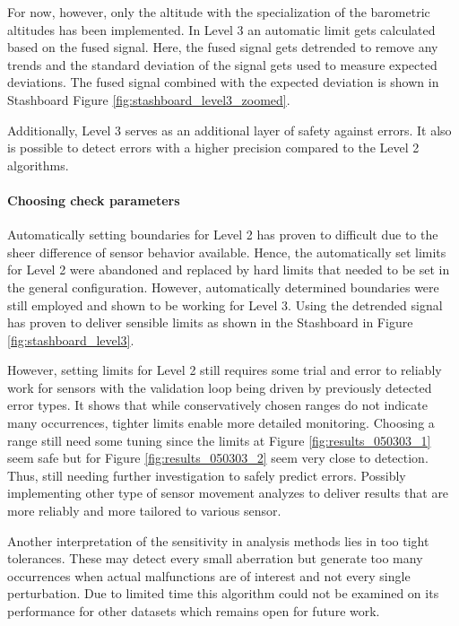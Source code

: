 For now, however, only the altitude with the specialization of the barometric altitudes has been implemented. In Level 3 an automatic limit gets calculated based on the fused signal. Here, the fused signal gets detrended to remove any trends and the standard deviation of the signal gets used to measure expected deviations. The fused signal combined with the expected deviation is shown in Stashboard Figure \ref{fig:stashboard_level3_zoomed}.

Additionally, Level 3 serves as an additional layer of safety against errors. It also is possible to detect errors with a higher precision compared to the Level 2 algorithms.




\paragraph{Choosing check parameters}

Automatically setting boundaries for Level 2 has proven to difficult due to the sheer difference of sensor behavior available. Hence, the automatically set limits for Level 2 were abandoned and replaced by hard limits that needed to be set in the general configuration. However, automatically determined boundaries were still employed and shown to be working for Level 3. Using the detrended signal has proven to deliver sensible limits as shown in the Stashboard in Figure \ref{fig:stashboard_level3}.

However, setting limits for Level 2 still requires some trial and error to reliably work for sensors with the validation loop being driven by previously detected error types. It shows that while conservatively chosen ranges do not indicate many occurrences, tighter limits enable more detailed monitoring. Choosing a range still need some tuning since the limits at Figure \ref{fig:results_050303_1} seem safe but for Figure \ref{fig:results_050303_2} seem very close to detection. Thus, still needing further investigation to safely predict errors. Possibly implementing other type of sensor movement analyzes to deliver results that are more reliably and more tailored to various sensor.

Another interpretation of the sensitivity in analysis methods lies in too tight tolerances. These may detect every small aberration but generate too many occurrences when actual malfunctions are of interest and not every single perturbation. Due to limited time this algorithm could not be examined on its performance for other datasets which remains open for future work.


